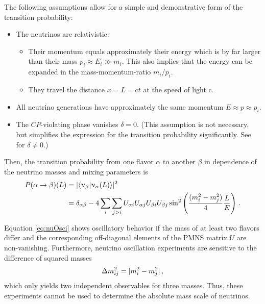 The following assumptions allow for a simple and demonstrative form of the transition probability:
\begin{itemize}
    \renewcommand{\labelitemi}{$\bullet$}
    \renewcommand{\labelitemii}{$\circ$}
    \item The neutrinos are relativistic: 
    \begin{itemize}
        \item Their momentum equals approximately their energy which is by far larger than their mass $p_i \approx E_i \gg m_i$. This also implies that the energy can be expanded in the mass-momentum-ratio $m_i/p_i$.
        \item They travel the distance $x=L=\mathrm{c}t$ at the speed of light $\mathrm{c}$.
    \end{itemize}
    \item All neutrino generations have approximately the same momentum $E \approx p \approx p_i$.
    \item The $CP$-violating phase vanishes $\delta=0$. (This assumption is not necessary, but simplifies the expression for the transition probability significantly. See \cite{zuber2011neutrino} for $\delta \neq 0$.)
\end{itemize}
Then, the transition probability from one flavor $\alpha$ to another $\beta$ in dependence of the neutrino masses and mixing parameters is
\begin{equation}
    \begin{split}
    P(\alpha \rightarrow \beta)(L) 
    &= \lvert\left\langle\upnu_\beta \middle| \upnu_\alpha(L)\right\rangle\rvert^2 \\
    &= 
    \delta_{\alpha\beta}-
    4\sum_{i}\sum_{j>i} U_{\alpha i} U_{\alpha j} U_{\beta i} U_{\beta j} 
    \sin^2\left( \frac{(m_i^2-m_j^2)}{4} \frac{L}{E} \right)
    \text{\,.}
    \end{split}
    \label{eq:nuOsci}
\end{equation}

Equation \eqref{eq:nuOsci} shows oscillatory behavior if the mass of at least two flavors differ and the corresponding off-diagonal elements of the PMNS matrix $U$ are non-vanishing. Furthermore, neutrino oscillation experiments are sensitive to the difference of squared masses 
\begin{equation}
    \label{eq:massSquaredDiff}
    \Delta m^2_{ij} =  \lvert m^2_i - m^2_j\rvert
    \text{\,,}
\end{equation}
which only yields two independent observables for three masses. Thus, these experiments cannot be used to determine the absolute mass scale of neutrinos.

